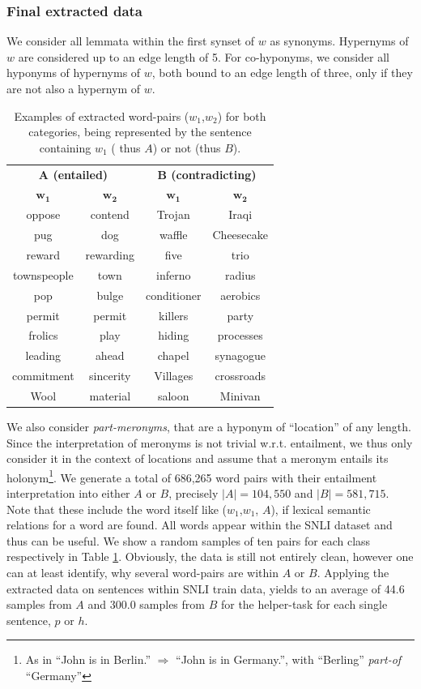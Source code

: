 \subsubsection{Final extracted data}
We consider all lemmata within the first synset of $w$ as synonyms. Hypernyms of $w$ are considered up to an edge length of 5. For co-hyponyms, we consider all hyponyms of hypernyms of $w$, both bound to an edge length of three, only if they are not also a hypernym of $w$. 
\begin{table}[tph!]
\centering
\begin{tabular}{cc|cc}
\multicolumn{2}{c}{\textbf{$\mathbf{A}$ (entailed)}} & \multicolumn{2}{c}{\textbf{$\mathbf{B}$ (contradicting)}} \\
\textbf{$\mathbf{w_1}$} & \textbf{$\mathbf{w_2}$} & \textbf{$\mathbf{w_1}$} & \textbf{$\mathbf{w_2}$} \\
\toprule
oppose & contend & Trojan & Iraqi\\
pug & dog & waffle & Cheesecake\\
reward & rewarding & five & trio \\
townspeople & town & inferno & radius \\
pop & bulge & conditioner & aerobics\\
permit & permit & killers & party\\
frolics & play & hiding & processes\\
leading & ahead & chapel & synagogue\\
commitment & sincerity & Villages & crossroads\\
Wool & material & saloon & Minivan\\
\bottomrule
\end{tabular}
\caption{Examples of extracted word-pairs ($w_1$,$w_2$) for both categories, being represented by the sentence containing $w_1$ ( thus $A$) or not (thus $B$).}
\label{tab:examples_extracted_wn}
\end{table}
We also consider \textit{part-meronyms}, that are a hyponym of ``location'' of any length. Since the interpretation of meronyms is not trivial w.r.t. entailment, we thus only consider it in the context of locations and assume that a meronym entails its holonym\footnote{As in ``John is in Berlin.'' $\Rightarrow$ ``John is in Germany.'', with ``Berling'' \textit{part-of} ``Germany''}. We generate a total of 686,265 word pairs with their entailment interpretation into either $A$ or $B$, precisely $|A|=104,550$ and $|B|=581,715$. Note that these include the word itself like ($w_1$,$w_1$, $A$), if lexical semantic relations for a word are found. All words appear within the \ac{SNLI} dataset and thus can be useful. We show a random samples of ten pairs for each class respectively in Table \ref{tab:examples_extracted_wn}.
Obviously, the data is still not entirely clean, however one can at least identify, why several word-pairs are within $A$ or $B$. Applying the extracted data on sentences within \ac{SNLI} train data, yields to an average of 44.6 samples from $A$ and 300.0 samples from $B$ for the helper-task for each single sentence, $p$ or $h$.
